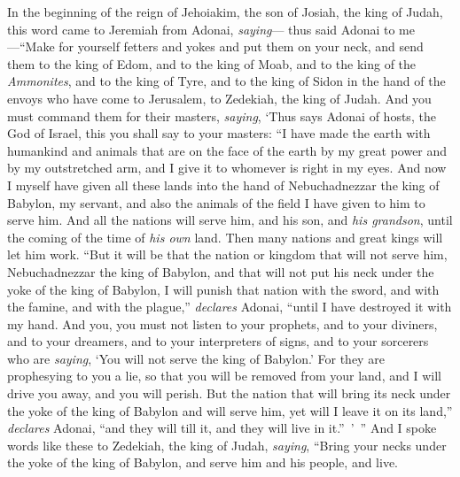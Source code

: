 \begin{biblechapter} %
 In the beginning of the reign of Jehoiakim, the son of Josiah, the king of Judah, this word came to Jeremiah from Adonai, \textit{saying}—
\verse thus said Adonai to me—“Make for yourself fetters and yokes and put them on your neck,
\verse and send them to the king of Edom, and to the king of Moab, and to the king of the \textit{Ammonites}, and to the king of Tyre, and to the king of Sidon in the hand of the envoys who have come to Jerusalem, to Zedekiah, the king of Judah.
\verse And you must command them for their masters, \textit{saying}, ‘Thus says Adonai of hosts, the God of Israel, this you shall say to your masters:
\verse “I have made the earth with humankind and animals that are on the face of the earth by my great power and by my outstretched arm, and I give it to whomever is right in my eyes.
\verse And now I myself have given all these lands into the hand of Nebuchadnezzar the king of Babylon, my servant, and also the animals of the field I have given to him to serve him.
\verse And all the nations will serve him, and his son, and \textit{his grandson}, until the coming of the time of \textit{his own} land. Then many nations and great kings will let him work.
\verse “But it will be that the nation or kingdom that will not serve him, Nebuchadnezzar the king of Babylon, and that will not put his neck under the yoke of the king of Babylon, I will punish that nation with the sword, and with the famine, and with the plague,” \textit{declares} Adonai, “until I have destroyed it with my hand.
\verse And you, you must not listen to your prophets, and to your diviners, and to your dreamers, and to your interpreters of signs, and to your sorcerers who are \textit{saying}, ‘You will not serve the king of Babylon.’
\verse For they are prophesying to you a lie, so that you will be removed from your land, and I will drive you away, and you will perish.
\verse But the nation that will bring its neck under the yoke of the king of Babylon and will serve him, yet will I leave it on its land,” \textit{declares} Adonai, “and they will till it, and they will live in it.” ’ ”
\verse And I spoke words like these to Zedekiah, the king of Judah, \textit{saying}, “Bring your necks under the yoke of the king of Babylon, and serve him and his people, and live.

\end{biblechapter}

